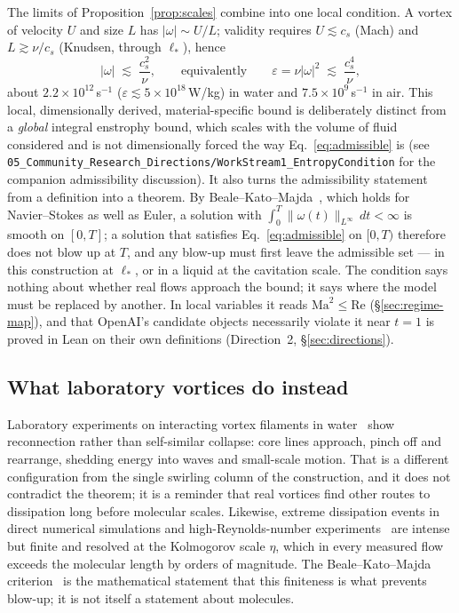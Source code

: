 \documentclass[11pt,a4paper]{article}
\begin{document}
The limits of Proposition~\ref{prop:scales} combine into one local condition. A vortex of velocity
$U$ and size $L$ has $|\omega|\sim U/L$; validity requires $U\lesssim c_s$ (Mach) and
$L\gtrsim\nu/c_s$ (Knudsen, through $\ell_*$), hence
\begin{equation}
  |\omega|\;\lesssim\;\frac{c_s^2}{\nu},\qquad\text{equivalently}\qquad
  \varepsilon=\nu|\omega|^2\;\lesssim\;\frac{c_s^4}{\nu},
  \label{eq:admissible}
\end{equation}
about $2.2\times10^{12}$\,s$^{-1}$ ($\varepsilon\lesssim5\times10^{18}$\,W/kg) in water and
$7.5\times10^{9}$\,s$^{-1}$ in air. This local, dimensionally derived, material-specific bound is
deliberately distinct from a \emph{global} integral enstrophy bound, which scales with the volume of
fluid considered and is not dimensionally forced the way Eq.~\eqref{eq:admissible} is (see
\texttt{05\_Community\_Research\_Directions/WorkStream1\_EntropyCondition} for the companion
admissibility discussion). It also turns the admissibility statement from a definition into a
theorem. By
Beale--Kato--Majda~\cite{BKM1984}, which holds for Navier--Stokes as well as Euler, a solution with
$\int_0^T\|\omega(t)\|_{L^\infty}\,dt<\infty$ is smooth on $[0,T]$; a solution that satisfies
Eq.~\eqref{eq:admissible} on $[0,T)$ therefore does not blow up at $T$, and any blow-up must first
leave the admissible set --- in this construction at $\ell_*$, or in a liquid at the cavitation
scale. The condition says nothing about whether real flows approach the bound; it says where the
model must be replaced by another. In local variables it reads $\mathrm{Ma}^2\le\mathrm{Re}$
(\S\ref{sec:regime-map}), and that OpenAI's candidate objects necessarily violate it near $t=1$ is
proved in Lean on their own definitions (Direction~2, \S\ref{sec:directions}).

\subsection{What laboratory vortices do instead}

Laboratory experiments on interacting vortex filaments in water~\cite{KlecknerIrvine2013} show
reconnection rather than self-similar collapse: core lines approach, pinch off and rearrange,
shedding energy into waves and small-scale motion. That is a different configuration from the
single swirling column of the construction, and it does not contradict the theorem; it is a
reminder that real vortices find other routes to dissipation long before molecular scales. Likewise,
extreme dissipation events in direct numerical simulations and high-Reynolds-number
experiments~\cite{Schumacher2014,Donzis2008} are intense but finite and resolved at the Kolmogorov
scale $\eta$, which in every measured flow exceeds the molecular length by orders of magnitude. The
Beale--Kato--Majda criterion~\cite{BKM1984} is the mathematical statement that this finiteness is
what prevents blow-up; it is not itself a statement about molecules.
\end{document}
